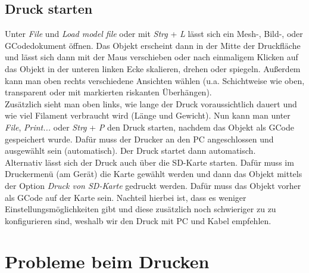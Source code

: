 \documentclass[11pt,a4paper]{scrartcl}
\begin{document}
\subsection*{Druck starten}
Unter \textit{File} und \textit{Load model file} oder mit \textit{Strg} + \textit{L} lässt sich ein Mesh-, Bild-, oder GCodedokument öffnen. Das Objekt erscheint dann in der Mitte der Druckfläche und lässt sich dann mit der Maus verschieben oder nach einmaligem Klicken auf das Objekt in der unteren linken Ecke skalieren, drehen oder spiegeln. Außerdem kann man oben rechts verschiedene Ansichten wählen (u.a. Schichtweise wie oben, transparent oder mit markierten riskanten Überhängen).\\
Zusätzlich sieht man oben links, wie lange der Druck voraussichtlich dauert und wie viel Filament verbraucht wird (Länge und Gewicht). Nun kann man unter \textit{File}, \textit{Print...} oder \textit{Strg} + \textit{P} den Druck starten, nachdem das Objekt als GCode gespeichert wurde. Dafür muss der Drucker an den PC angeschlossen und ausgewählt sein (automatisch). Der Druck startet dann automatisch.\\
Alternativ lässt sich der Druck auch über die SD-Karte starten. Dafür muss im Druckermenü (am Gerät) die Karte gewählt werden und dann das Objekt mittels der Option \textit{Druck von SD-Karte} gedruckt werden. Dafür muss das Objekt vorher als GCode auf der Karte sein. Nachteil hierbei ist, dass es weniger Einstellungsmöglichkeiten gibt und diese zusätzlich noch schwieriger zu zu konfigurieren sind, weshalb wir den Druck mit PC und Kabel empfehlen. 
\pagebreak
\section{Probleme beim Drucken}

\end{document}

